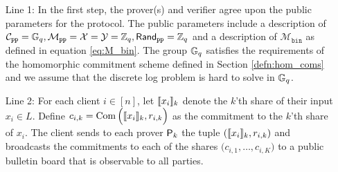 \begin{enumerate}
    \item[Line 1:]{ In the first step, the prover(s) and verifier agree upon the public parameters for the protocol. The public parameters include a description of $\mathcal{C}_{\texttt{pp}} = \mathbb{G}_q, \mathcal{M}_{\texttt{pp}} = \mathcal{X} = \mathcal{Y} = \mathbb{Z}_q, \mathsf{Rand}_{\texttt{pp}}= \mathbb{Z}_q$ and a description of $\mathcal{M}_\texttt{bin}$ as defined in equation \eqref{eq:M_bin}. 
    The group $\mathbb{G}_q$ satisfies the requirements of the homomorphic commitment scheme defined in Section \ref{defn:hom_coms} and we assume that the discrete log problem is hard to solve in $\mathbb{G}_q$.}

\item[Line 2:]{ For each client $i \in [n]$, let $\llbracket x_i \rrbracket_k$ denote the $k$'th share of their input $x_i \in L$. 
Define $c_{i,k} = \operatorname{Com}\Big(\llbracket x_i \rrbracket_k,  r_{i,k}\Big)$ as the commitment to the $k$'th share of $x_i$. 
The client sends to each prover $\mathsf{P}_k$ the tuple $(\llbracket x_i \rrbracket_k,  r_{i,k})$ and broadcasts 
the commitments to each of the shares $\Big( c_{i,1}, \dots, c_{i,K} \Big)$ to a public bulletin board that is observable to all parties.}


\end{enumerate}
